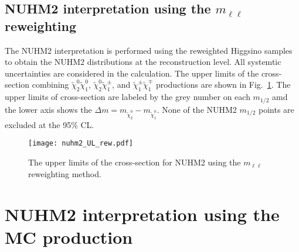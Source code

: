 
\subsection{NUHM2 interpretation using the $m_{\ell \ell}$ reweighting}
\label{subsec:results_mll_reweighting_interpretation}
The NUHM2 interpretation is performed using the reweighted Higgsino samples to obtain the NUHM2 distributions at the reconstruction level.
All systemtic uncertainties are considered in the calculation.
The upper limits of the cross-section combining $\widetilde{\chi}^{0}_{2} \widetilde{\chi}^{0}_{1}$, $\widetilde{\chi}^{0}_{2} \widetilde{\chi}^{\pm}_{1}$, and $\widetilde{\chi}^{\pm}_{1} \widetilde{\chi}^{\mp}_{1}$ productions are shown in Fig.~\ref{fig:results_nuhm2_interpretation_reweighting}.
The upper limits of cross-section are labeled by the grey number on each $m_{1/2}$ amd the lower axis shows the $\Delta m = m_{\widetilde{\chi}^{0}_{2}} - m_{\widetilde{\chi}^{0}_{1}}$.
None of the NUHM2 $m_{1/2}$ points are excluded at the 95\% CL.

\begin{figure}[htbp]
    \begin{center}
        \texttt{[image: nuhm2\_UL\_rew.pdf]}
        \caption{The upper limits of the cross-section for NUHM2 using the $m_{\ell \ell}$ reweighting method.}
        \label{fig:results_nuhm2_interpretation_reweighting}
    \end{center}
\end{figure}


\section{NUHM2 interpretation using the MC production}
\label{sec:results_mc_production_interpretation}